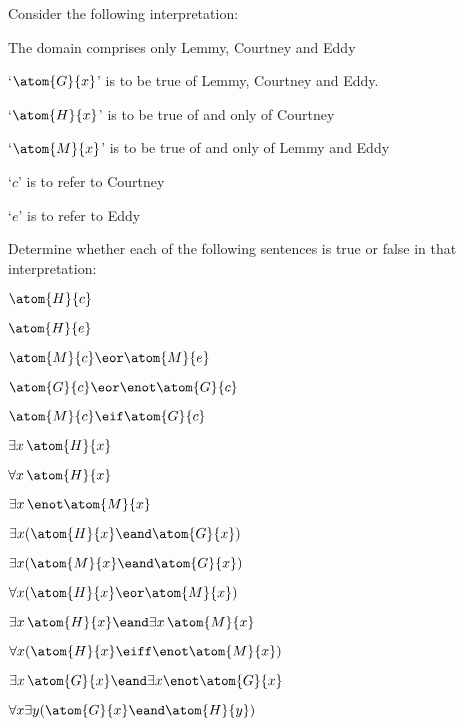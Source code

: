 \problempart
\label{pr.TorF2}
Consider the following interpretation:	
	\begin{ebullet}
		\item The domain comprises only Lemmy, Courtney and Eddy
		\item `$\atom{G}{x}$' is to be true of Lemmy, Courtney and Eddy.
		\item `$\atom{H}{x}$' is to be true of and only of Courtney
		\item `$\atom{M}{x}$' is to be true of and only of Lemmy and Eddy
		\item `$c$' is to refer to Courtney
		\item `$e$' is to refer to Eddy
	\end{ebullet}
Determine whether each of the following sentences is true or false in that interpretation:
\begin{earg}
\item $\atom{H}{c} $
\item $\atom{H}{e} $
\item $\atom{M}{c}  \eor \atom{M}{e}$
\item $\atom{G}{c}  \eor \enot \atom{G}{c}$
\item $\atom{M}{c}  \eif \atom{G}{c}$
\item $\exists x\, \atom{H}{x}$
\item $\forall x\, \atom{H}{x}$
\item $\exists x\, \enot \atom{M}{x}$
\item $\exists x(\atom{H}{x} \eand \atom{G}{x})$
\item $\exists x(\atom{M}{x} \eand \atom{G}{x})$
\item $\forall x(\atom{H}{x} \eor \atom{M}{x})$
\item $\exists x\, \atom{H}{x} \eand \exists x\, \atom{M}{x}$
\item $\forall x(\atom{H}{x} \eiff \enot \atom{M}{x})$
\item $\exists x\, \atom{G}{x} \eand \exists x \enot \atom{G}{x}$
\item $\forall x\exists y(\atom{G}{x} \eand \atom{H}{y})$
\end{earg}

